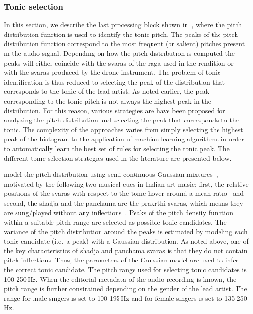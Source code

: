 \subsubsection{Tonic selection}
\label{sec:tonic_selection}

In this section, we describe the last processing block shown in~, where the pitch distribution function is used to identify the tonic pitch. The peaks of the pitch distribution function correspond to the most frequent (or salient) pitches present in the audio signal. Depending on how the pitch distribution is computed the peaks will either coincide with the \glspl{svara} of the \gls{raga} used in the rendition or with the \glspl{svara} produced by the drone instrument. The problem of tonic identification is thus reduced to selecting the peak of the distribution that corresponds to the tonic of the lead artist. As noted earlier, the peak corresponding to the tonic pitch is not always the highest peak in the distribution. For this reason, various strategies are have been proposed for analyzing the pitch distribution and selecting the peak that corresponds to the tonic. The complexity of the approaches varies from simply selecting the highest peak of the histogram to the application of machine learning algorithms in order to automatically learn the best set of rules for selecting the tonic peak. The different tonic selection strategies used in the literature are presented below.

\cite{ranjani2011carnatic} model the pitch distribution using semi-continuous Gaussian mixtures~\citep{Huang2001}, motivated by the following two musical cues in Indian art music; first, the relative positions of the \glspl{svara} with respect to the tonic hover around a mean ratio~\citep{Krishnaswamy2003} and second, the \gls{shadja} and the \gls{panchama} are the prakrthi \glspl{svara}, which means they are sung/played without any inflections~\citep{Manikandan2004,Krishnaswamyicassp2003}. Peaks of the pitch density function within a suitable pitch range are selected as possible tonic candidates. The variance of the pitch distribution around the peaks is estimated by modeling each tonic candidate (i.e.~a peak) with a Gaussian distribution. As noted above, one of the key characteristics of \gls{shadja} and \gls{panchama} \glspl{svara} is that they do not contain pitch inflections. Thus, the parameters of the Gaussian model are used to infer the correct tonic candidate. The pitch range used for selecting tonic candidates is 100-250\,Hz. When the editorial metadata of the audio recording is known, the pitch range is further constrained depending on the gender of the lead artist. The range for male singers is set to 100-195\,Hz and for female singers is set to 135-250\,Hz.

